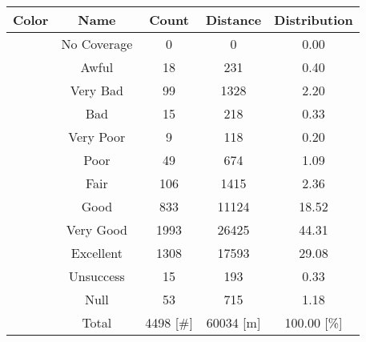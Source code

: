 \begin{tabular}{|c|c|c|c|c|}\hline
\rowcolor{Plum!20}
Color&Name&Count&Distance&Distribution\\\hline\hline
\cellcolor[HTML]{aaaaaa} &No Coverage&0&0&0.00\\\hline
\cellcolor[HTML]{820000} &Awful&18&231&0.40\\\hline
\cellcolor[HTML]{dc143c} &Very Bad&99&1328&2.20\\\hline
\cellcolor[HTML]{ff0000} &Bad&15&218&0.33\\\hline
\cellcolor[HTML]{fa6400} &Very Poor&9&118&0.20\\\hline
\cellcolor[HTML]{ffaa00} &Poor&49&674&1.09\\\hline
\cellcolor[HTML]{ffff00} &Fair&106&1415&2.36\\\hline
\cellcolor[HTML]{00d228} &Good&833&11124&18.52\\\hline
\cellcolor[HTML]{00a032} &Very Good&1993&26425&44.31\\\hline
\cellcolor[HTML]{00703c} &Excellent&1308&17593&29.08\\\hline
\cellcolor[HTML]{1e90ff} &Unsuccess&15&193&0.33\\\hline
\cellcolor[HTML]{000000} &Null&53&715&1.18\\\hline
\cellcolor[HTML]{ffffff} &Total&4498 [\#]&60034 [m]&100.00 [\%]\\\hline
\end{tabular}
